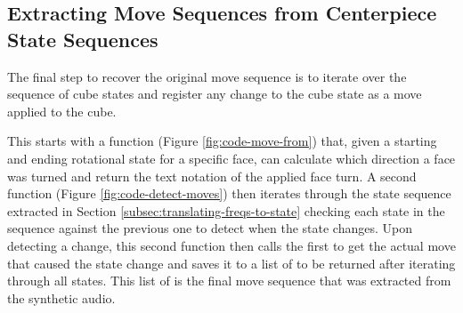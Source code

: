 \newpage
\subsection{Extracting Move Sequences from Centerpiece State Sequences}
\label{subsec:extract-moves}

The final step to recover the original move sequence is to iterate over
the sequence of cube states and register any change to the cube state
as a move applied to the cube.

This starts with a function (Figure \ref{fig:code-move-from}) that,
given a starting and ending rotational state for a specific face, can
calculate which direction a face was turned and return the text
notation of the applied face turn. A second function (Figure
\ref{fig:code-detect-moves}) then iterates through the state sequence
extracted in Section \ref{subsec:translating-freqs-to-state} checking
each state in the sequence against the previous one to detect when the
state changes. Upon detecting a change, this second function then calls
the first to get the actual move that caused the state change and saves
it to a list of  to be returned after iterating
through all states. This list of  is the final
move sequence that was extracted from the synthetic audio.



